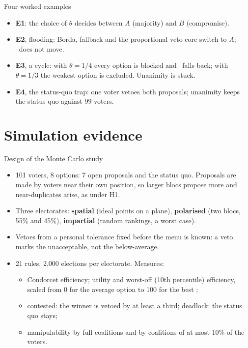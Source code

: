 \documentclass[10pt,aspectratio=169]{beamer}
\begin{document}
\begin{frame}{Four worked examples}
  \fittables
  \vspace{-0.5em}
  \begin{itemize}\small
    \item \textbf{E1}: the choice of $\theta$ decides between $A$ (majority) and $B$ (compromise).
    \item \textbf{E2}, flooding: Borda, fallback and the proportional veto core switch to $A$; \QVC\ does not
      move.
    \item \textbf{E3}, a cycle: with $\theta = 1/4$ every option is blocked and \QVC\ falls back; with
      $\theta = 1/3$ the weakest option is excluded. Unanimity is stuck.
    \item \textbf{E4}, the status-quo trap: one voter vetoes both proposals; unanimity keeps the status
      quo against 99 voters.
  \end{itemize}
\end{frame}

\section{Simulation evidence}

\begin{frame}{Design of the Monte Carlo study}
  \begin{itemize}
    \item 101 voters, 8 options: 7 open proposals and the status quo. Proposals are made by voters near
      their own position, so larger blocs propose more and near-duplicates arise, as under H1.
    \item Three electorates: \textbf{spatial} (ideal points on a plane), \textbf{polarised} (two blocs, 55\%
      and 45\%), \textbf{impartial} (random rankings, a worst case).
    \item Vetoes from a personal tolerance fixed before the menu is known: a veto marks the unacceptable,
      not the below-average.
    \item 21 rules, 2,000 elections per electorate. Measures:
      \begin{itemize}\small
        \item Condorcet efficiency; utility and worst-off (10th percentile) efficiency, scaled from 0 for the
          average option to 100 for the best ;
        \item contested: the winner is vetoed by at least a third; deadlock: the status quo stays;
        \item manipulability by full coalitions and by coalitions of at most 10\% of the voters.
      \end{itemize}
  \end{itemize}
\end{frame}
\end{document}
